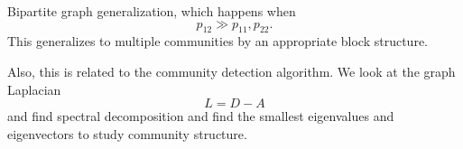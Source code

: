 \begin{itemize}
	      \begin{remark}
		      Bipartite graph generalization, which happens when
		      \[
			      p_{12}\gg p_{11}, p_{22}.
		      \]
		      This generalizes to multiple communities by an appropriate block structure.

		      \begin{figure}[H]
			      \centering
			      \label{fig:bipartite-graph-generalization}
		      \end{figure}

		      Also, this is related to the community detection algorithm. We look at the graph Laplacian
		      \[
			      L = D - A
		      \]
		      and find spectral decomposition and find the smallest eigenvalues and eigenvectors to study community structure.
	      \end{remark}
\end{itemize}

\hr

